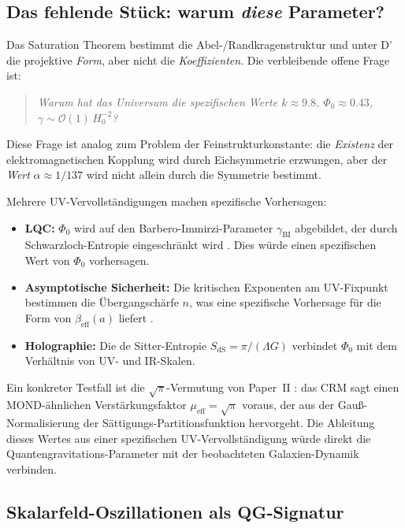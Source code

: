 \documentclass[aps,prd,twocolumn,superscriptaddress,nofootinbib]{revtex4-2}
\begin{document}
\subsection{Das fehlende Stück: warum \textit{diese} Parameter?}

Das Saturation Theorem bestimmt die Abel-/Randkragenstruktur und unter D' die projektive \textit{Form}, aber nicht die \textit{Koeffizienten}. Die verbleibende offene Frage ist:

\begin{quote}
\textit{Warum hat das Universum die spezifischen Werte $k \approx 9.8$, $\Phi_0 \approx 0.43$, $\gamma \sim \mathcal{O}(1)\,H_0^{-2}$?}
\end{quote}

Diese Frage ist analog zum Problem der Feinstrukturkonstante: die \textit{Existenz} der elektromagnetischen Kopplung wird durch Eichsymmetrie erzwungen, aber der \textit{Wert} $\alpha \approx 1/137$ wird nicht allein durch die Symmetrie bestimmt.

Mehrere UV-Vervollständigungen machen spezifische Vorhersagen:
\begin{itemize}
\item \textbf{LQC:} $\Phi_0$ wird auf den Barbero-Immirzi-Parameter $\gamma_{\mathrm{BI}}$ abgebildet, der durch Schwarzloch-Entropie eingeschränkt wird \cite{Meissner2004}. Dies würde einen spezifischen Wert von $\Phi_0$ vorhersagen.
\item \textbf{Asymptotische Sicherheit:} Die kritischen Exponenten am UV-Fixpunkt bestimmen die Übergangschärfe $n$, was eine spezifische Vorhersage für die Form von $\beta_{\mathrm{eff}}(a)$ liefert \cite{Reuter1998}.
\item \textbf{Holographie:} Die de Sitter-Entropie $S_{\mathrm{dS}} = \pi/(\Lambda G)$ verbindet $\Phi_0$ mit dem Verhältnis von UV- und IR-Skalen.
\end{itemize}

Ein konkreter Testfall ist die $\sqrt{\pi}$-Vermutung von Paper~II \cite{Geiger2026b}: das CRM sagt einen MOND-ähnlichen Verstärkungsfaktor $\mu_{\mathrm{eff}} = \sqrt{\pi}$ voraus, der aus der Gauß-Normalisierung der Sättigungs-Partitionsfunktion hervorgeht. Die Ableitung dieses Wertes aus einer spezifischen UV-Vervollständigung würde direkt die Quantengravitations-Parameter mit der beobachteten Galaxien-Dynamik verbinden.

\subsection{Skalarfeld-Oszillationen als QG-Signatur}
\end{document}

